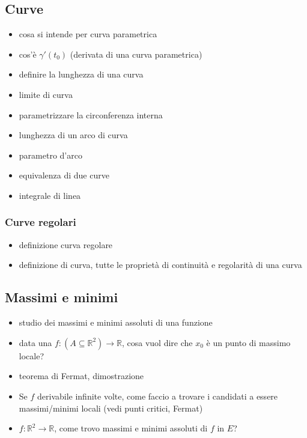 \documentclass[11pt]{article}
\begin{document}
\subsection{Curve}
\label{sec:org4b8c6ed}
\begin{itemize}
\item cosa si intende per curva parametrica
\item cos'è \(\gamma'(t_0)\) (derivata di una curva parametrica)
\item definire la lunghezza di una curva
\item limite di curva
\item parametrizzare la circonferenza interna
\item lunghezza di un arco di curva
\item parametro d'arco
\item equivalenza di due curve
\item integrale di linea
\end{itemize}

\subsubsection{Curve regolari}
\label{sec:org4b75e2b}
\begin{itemize}
\item definizione curva regolare
\item definizione di curva, tutte le proprietà di continuità e regolarità di una curva
\end{itemize}

\subsection{Massimi e minimi}
\label{sec:org012794e}
\begin{itemize}
\item studio dei massimi e minimi assoluti di una funzione
\item data una \(f : (A \subseteq \mathbb{R}^2) \to \mathbb{R}\), cosa vuol dire che \(x_0\) è un
punto di massimo locale?
\item teorema di Fermat, dimostrazione
\item Se \(f\) derivabile infinite volte, come faccio a trovare i candidati a essere
massimi/minimi locali (vedi punti critici, Fermat)
\item \(f : \mathbb{R}^2 \to \mathbb{R}\), come trovo massimi e minimi assoluti di \(f\) in \(E\)?
\end{itemize}
\end{document}
